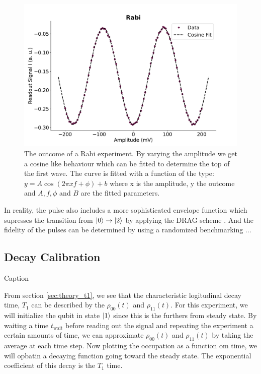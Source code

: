 \begin{figure}
    \centering
    \includegraphics{Calibrations/Figures/Rabi.pdf}
    \caption{The outcome of a Rabi experiment. By varying the amplitude we get a cosine like behaviour which can be fitted to determine the top of the first wave. The curve is fitted with a function of the type: $y = A \cos(2 \pi x f + \phi) + b$ where x is the amplitude, y the outcome and $A, f, \phi$ and $B$ are the fitted parameters.}
    \label{fig:calibration_rabi}
\end{figure}
\noindent
In reality, the pulse also includes a more sophisticated envelope function which supresses the transition from $\ket{0}\to\ket{2}$ by applying the DRAG scheme \cite{motzoi_simple_2009}. And the fidelity of the pulses can be determined by using a randomized benchmarking ... 


\subsection{Decay Calibration}\label{sec:calibration_t1}
\begin{marginfigure}
    \centering
    \caption{Caption}
    \label{fig:enter-label}
\end{marginfigure}

From section \ref{sec:theory_t1}, we see that the characteristic logitudinal decay time, $T_1$ can be described by the $\rho_{00}(t)$ and $\rho_{11}(t)$. For this experiment, we will initialize the qubit in state $\ket{1}$ since this is the furthers from steady state. By waiting a time $t_{\text{wait}}$ before reading out the signal and repeating the experiment a certain amounts of time, we can approximate  $\rho_{00}(t)$ and $\rho_{11}(t)$ by taking the average at each time step. Now plotting the occupation as a function om time, we will opbatin a decaying function going toward the steady state. The exponential coefficient of this decay is the $T_1$ time. 


